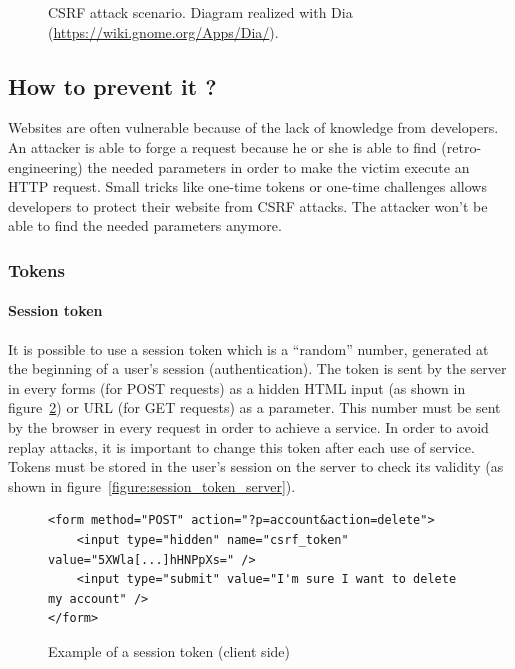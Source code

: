 \documentclass[a4paper,11pt,openany]{report}
\begin{document}
\begin{figure}[h!t]
  \begin{center}
    \caption{
      CSRF attack scenario. Diagram realized with Dia (\url{https://wiki.gnome.org/Apps/Dia/}).
    }
    \label{figure:csrf_scenario}
  \end{center}
\end{figure}
  
  \subsection{How to prevent it ?}
  Websites are often vulnerable because of the lack of knowledge from developers. An attacker is able 
  to forge a request because he or she is able to find (retro-engineering) the needed parameters in 
  order to make the victim execute an HTTP request. Small tricks like one-time tokens or one-time 
  challenges allows developers to protect their website from CSRF attacks. The attacker won't be able 
  to find the needed parameters anymore.
  
  \subsubsection{Tokens}
  
  \paragraph{Session token}
  It is possible to use a session token which is a ``random'' number, generated at the beginning 
  of a user's session (authentication). The token is sent by the server in every forms (for POST 
  requests) as a hidden HTML input (as shown in figure~\ref{figure:session_token_client}) or URL 
  (for GET requests) as a parameter. This number must be sent by the browser in every request in 
  order to achieve a service. In order to avoid replay attacks, it is important to change this token 
  after each use of service. Tokens must be stored in the user's session on the server to check its 
  validity (as shown in figure~\ref{figure:session_token_server}).
  
  \begin{figure}[h!t]
  \begin{verbatim}
<form method="POST" action="?p=account&action=delete">
    <input type="hidden" name="csrf_token" value="5XWla[...]hHNPpXs=" />
    <input type="submit" value="I'm sure I want to delete my account" />
</form>
  \end{verbatim}
  \caption{Example of a session token (client side)}
  \label{figure:session_token_client}
  \end{figure}
  
\end{document}

